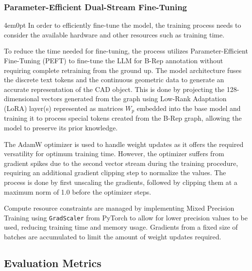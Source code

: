 		\subsubsection{Parameter-Efficient Dual-Stream Fine-Tuning}
			\begin{indentedblock}{4em}{0pt}
				In order to efficiently fine-tune the model, the training process needs to consider the available hardware and other resources such as training time.
				
				To reduce the time needed for fine-tuning, the process utilizes Parameter-Efficient Fine-Tuning (PEFT) to fine-tune the LLM for B-Rep annotation without requiring complete retraining from the ground up. The model architecture fuses the discrete text tokens and the continuous geometric data to generate an accurate representation of the CAD object. This is done by projecting the 128-dimensional vectors generated from the graph using Low-Rank Adaptation (LoRA) layer(s) represented as matrices $W_p$ embedded into the base model and training it to process special tokens created from the B-Rep graph, allowing the model to preserve its prior knowledge.  
				
				
				The AdamW optimizer is used to handle weight updates as it offers the required versatility for optimum training time. However, the optimizer suffers from gradient spikes due to the second vector stream during the training procedure, requiring an additional gradient clipping step to normalize the values. The process is done by first unscaling the gradients, followed by clipping them at a maximum norm of 1.0 before the optimizer steps.
				
				
				Compute resource constraints are managed by implementing Mixed Precision Training using \texttt{GradScaler} from PyTorch to allow for lower precision values to be used, reducing training time and memory usage. Gradients from a fixed size of batches are accumulated to limit the amount of weight updates required. 
			\end{indentedblock}
	
	\subsection{Evaluation Metrics}
